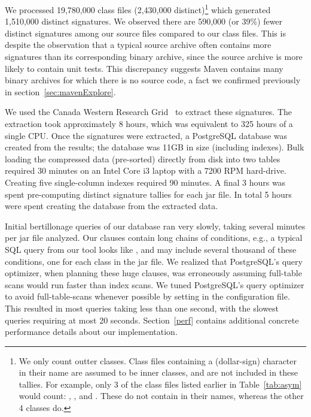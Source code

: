 We processed  19,780,000                                              
class files (2,430,000  distinct)\footnote{We only count outter classes.
Class files containing a \mytt{\$} (dollar-sign) character in their name are assumed to be inner classes,
and are not included in these tallies.  For example, only 3 of the class files listed earlier in Table~\ref{tab:asym} would count:
, , and .  These do not contain
\mytt{\$} in their names, whereas the other 4 classes do.}
which generated  1,510,000                                             
distinct signatures.  We observed there are 590,000 (or 39\%) fewer
distinct signatures among our source files compared to our class files.
This is despite the observation that a typical source archive often
contains more signatures than its corresponding binary archive, since the
source archive is more likely to contain unit tests.  This discrepancy
suggests Maven contains many binary archives for which there is no source
code, a fact we confirmed previously in section~\ref{sec:mavenExplore}.

We used the Canada Western Research Grid~\cite{WCRG} to extract these signatures. The
extraction took approximately 8 hours, which was equivalent to 325 hours of a
single CPU. Once the signatures were extracted, a PostgreSQL database was
created from the results; the database was 11GB in size (including indexes).
Bulk loading the compressed data (pre-sorted) directly from disk into two tables
required 30 minutes on an Intel Core i3 laptop with a 7200 RPM hard-drive.
Creating five single-column indexes required 90 minutes.
A final 3 hours was spent pre-computing distinct signature tallies
for each jar file.  In total 5 hours were spent creating the database from the
extracted data.

Initial bertillonage queries of our database ran very slowly, taking several minutes
per jar file analyzed.
Our  clauses contain long chains of  conditions, e.g., a typical
SQL query from our tool looks like
, and may include several thousand
of these  conditions,
one for each class in the jar file.
We realized that PostgreSQL's query optimizer, when planning these huge  clauses,
was erroneously assuming full-table scans would run faster than index scans.
We tuned PostgreSQL's query optimizer to avoid full-table-scans whenever
possible by setting  in the configuration file.
This resulted in most queries taking less than one second, with the slowest queries
requiring at most 20 seconds.  Section~\ref{perf} contains additional concrete
performance details about our implementation.



